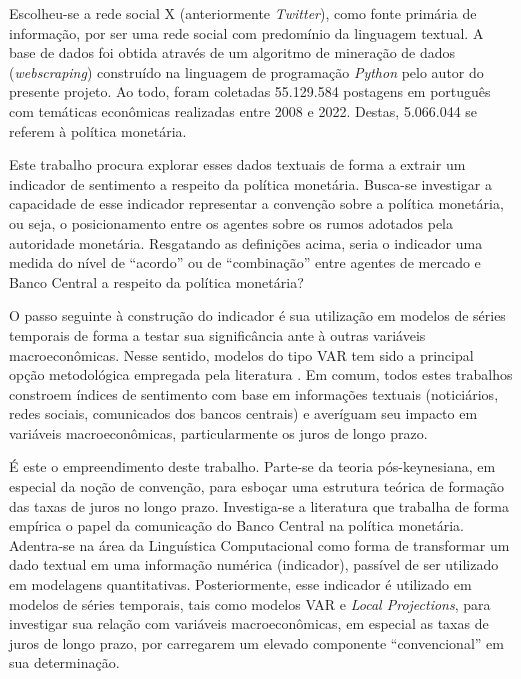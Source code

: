 Escolheu-se a rede social X (anteriormente \textit{Twitter}), como fonte primária de informação, por ser uma rede social com predomínio da linguagem textual.
A base de dados foi obtida através de um algoritmo de mineração de dados (\textit{webscraping}) construído na linguagem de programação \textit{Python} pelo autor do presente projeto. Ao todo, foram coletadas 55.129.584 postagens em português com temáticas econômicas realizadas entre 2008 e 2022. Destas, 5.066.044 se referem à política monetária.

Este trabalho procura explorar esses dados textuais de forma a extrair um indicador de sentimento a respeito da política monetária. Busca-se investigar a capacidade de esse indicador representar a convenção sobre a política monetária, ou seja, o posicionamento entre os agentes sobre os rumos adotados pela autoridade monetária. Resgatando as definições acima, seria o indicador uma medida do nível de \enquote{acordo} ou de \enquote{combinação} entre agentes de mercado e Banco Central a respeito da política monetária?

O passo seguinte à construção do indicador é sua utilização em modelos de séries temporais de forma a testar sua significância ante à outras variáveis macroeconômicas. Nesse sentido, modelos do tipo VAR tem sido a principal opção metodológica empregada pela literatura \parencite{bloom_impact_2009, lucca_measuring_2009, haddow_macroeconomic_2013, baker_measuring_2016, nyman_news_2021}. Em comum, todos estes trabalhos constroem índices de sentimento com base em informações textuais (noticiários, redes sociais, comunicados dos bancos centrais) e averíguam seu impacto em variáveis macroeconômicas, particularmente os juros de longo prazo. 

É este o empreendimento deste trabalho. Parte-se da teoria pós-keynesiana, em especial da noção de convenção, para esboçar uma estrutura teórica de formação das taxas de juros no longo prazo. Investiga-se a literatura que trabalha de forma empírica o papel da comunicação do Banco Central na política monetária. Adentra-se na área da Linguística Computacional como forma de transformar um dado textual em uma informação numérica (indicador), passível de ser utilizado em modelagens quantitativas. Posteriormente, esse indicador é utilizado em modelos de séries temporais, tais como modelos VAR e \textit{Local Projections}, para investigar sua relação com variáveis macroeconômicas, em especial as taxas de juros de longo prazo, por carregarem um elevado componente \enquote{convencional} em sua determinação. 

